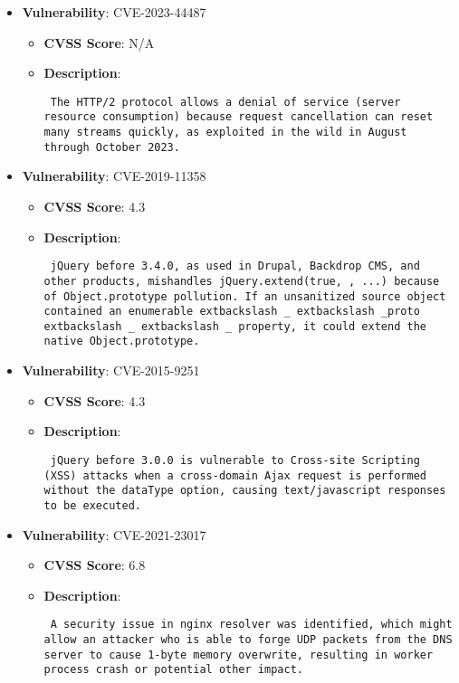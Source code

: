 \documentclass{article}
\begin{document}
\begin{itemize}
    
        \item \textbf{Vulnerability}: CVE-2023-44487
        \begin{itemize}
            \item \textbf{CVSS Score}:  N/A 
            \item \textbf{Description}: \parbox{\linewidth}{\texttt{ The HTTP/2 protocol allows a denial of service (server resource consumption) because request cancellation can reset many streams quickly, as exploited in the wild in August through October 2023. }}
        \end{itemize}
    
        \item \textbf{Vulnerability}: CVE-2019-11358
        \begin{itemize}
            \item \textbf{CVSS Score}:  4.3 
            \item \textbf{Description}: \parbox{\linewidth}{\texttt{ jQuery before 3.4.0, as used in Drupal, Backdrop CMS, and other products, mishandles jQuery.extend(true, {}, ...) because of Object.prototype pollution. If an unsanitized source object contained an enumerable 	extbackslash _	extbackslash _proto	extbackslash _	extbackslash _ property, it could extend the native Object.prototype. }}
        \end{itemize}
    
        \item \textbf{Vulnerability}: CVE-2015-9251
        \begin{itemize}
            \item \textbf{CVSS Score}:  4.3 
            \item \textbf{Description}: \parbox{\linewidth}{\texttt{ jQuery before 3.0.0 is vulnerable to Cross-site Scripting (XSS) attacks when a cross-domain Ajax request is performed without the dataType option, causing text/javascript responses to be executed. }}
        \end{itemize}
    
        \item \textbf{Vulnerability}: CVE-2021-23017
        \begin{itemize}
            \item \textbf{CVSS Score}:  6.8 
            \item \textbf{Description}: \parbox{\linewidth}{\texttt{ A security issue in nginx resolver was identified, which might allow an attacker who is able to forge UDP packets from the DNS server to cause 1-byte memory overwrite, resulting in worker process crash or potential other impact. }}
        \end{itemize}
    

\end{itemize}
\end{document}
